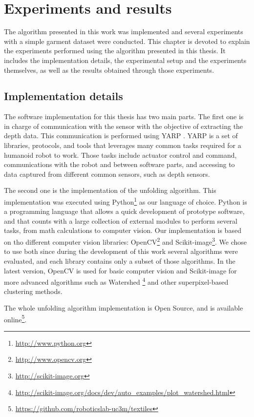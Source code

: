 \chapter{Experiments and results}
\label{experiments_and_results}

The algorithm presented in this work was implemented and several experiments with a simple garment dataset were conducted. This chapter is devoted to explain the experiments performed using the algorithm presented in this thesis. It includes the implementation details, the experimental setup and the experiments themselves, as well as the results obtained through those experiments.

\section{Implementation details}
\label{experiments:implementation}
The software implementation for this thesis has two main parts. The first one is in charge of communication with the sensor with the objective of extracting the depth data. This communication is performed using YARP . YARP is a set of libraries, protocols, and tools that leverages many common tasks required for a humanoid robot to work. Those tasks include actuator control and command, communications with the robot and between software parts, and accessing to data captured from different common sensors, such as depth sensors.

The second one is the implementation of the unfolding algorithm. This implementation was executed using Python\footnote{\url{http://www.python.org}} as our language of choice. Python is a programming language that allows a quick development of prototype software, and that counts with a large collection of external modules to perform several tasks, from math calculations to computer vision. Our implementation is based on tho different computer vision libraries: OpenCV\footnote{\url{http://www.opencv.org}} and Scikit-image\footnote{\url{http://scikit-image.org}}. We chose to use both since during the development of this work several algorithms were evaluated, and each library contains only a subset of those algorithms. In the latest version, OpenCV is used for basic computer vision and Scikit-image for more advanced algorithms such as Watershed \footnote{\url{http://scikit-image.org/docs/dev/auto_examples/plot_watershed.html}} and other superpixel-based clustering methods. 

The whole unfolding algorithm implementation is Open Source, and is available online\footnote{\url{https://github.com/roboticslab-uc3m/textiles}}.


